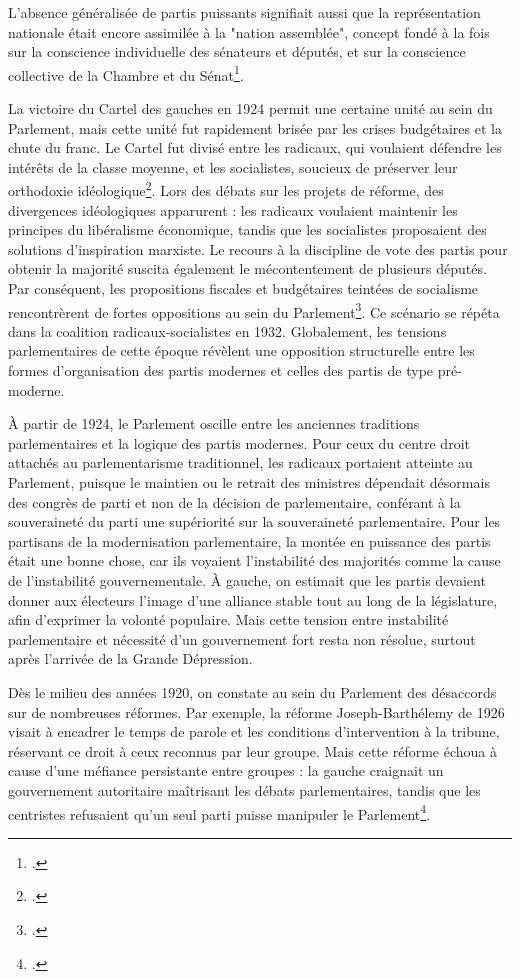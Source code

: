 \documentclass[a4paper,twoside,12pt]{book}
\begin{document}
L'absence généralisée de partis puissants signifiait aussi que la représentation nationale était encore assimilée à la "nation assemblée", concept fondé à la fois sur la conscience individuelle des sénateurs et députés, et sur la conscience collective de la Chambre et du Sénat\footcite[p.344]{zotero-515}.

La victoire du Cartel des gauches en 1924 permit une certaine unité au sein du Parlement, mais cette unité fut rapidement brisée par les crises budgétaires et la chute du franc. Le Cartel fut divisé entre les radicaux, qui voulaient défendre les intérêts de la classe moyenne, et les socialistes, soucieux de préserver leur orthodoxie idéologique\footcite[p.349]{zotero-515}. Lors des débats sur les projets de réforme, des divergences idéologiques apparurent : les radicaux voulaient maintenir les principes du libéralisme économique, tandis que les socialistes proposaient des solutions d'inspiration marxiste. Le recours à la discipline de vote des partis pour obtenir la majorité suscita également le mécontentement de plusieurs députés. Par conséquent, les propositions fiscales et budgétaires teintées de socialisme rencontrèrent de fortes oppositions au sein du Parlement\footcite[p.350]{zotero-515}. Ce scénario se répéta dans la coalition radicaux-socialistes en 1932. Globalement, les tensions parlementaires de cette époque révèlent une opposition structurelle entre les formes d'organisation des partis modernes et celles des partis de type pré-moderne.

À partir de 1924, le Parlement oscille entre les anciennes traditions parlementaires et la logique des partis modernes. Pour ceux du centre droit attachés au parlementarisme traditionnel, les radicaux portaient atteinte au Parlement, puisque le maintien ou le retrait des ministres dépendait désormais des congrès de parti et non de la décision de parlementaire, conférant à la souveraineté du parti une supériorité sur la souveraineté parlementaire. Pour les partisans de la modernisation parlementaire, la montée en puissance des partis était une bonne chose, car ils voyaient l'instabilité des majorités comme la cause de l'instabilité gouvernementale. À gauche, on estimait que les partis devaient donner aux électeurs l'image d'une alliance stable tout au long de la législature, afin d'exprimer la volonté populaire. Mais cette tension entre instabilité parlementaire et nécessité d'un gouvernement fort resta non résolue, surtout après l'arrivée de la Grande Dépression.

Dès le milieu des années 1920, on constate au sein du Parlement des désaccords sur de nombreuses réformes. Par exemple, la réforme Joseph-Barthélemy de 1926 visait à encadrer le temps de parole et les conditions d'intervention à la tribune, réservant ce droit à ceux reconnus par leur groupe. Mais cette réforme échoua à cause d'une méfiance persistante entre groupes : la gauche craignait un gouvernement autoritaire maîtrisant les débats parlementaires, tandis que les centristes refusaient qu'un seul parti puisse manipuler le Parlement\footcite[p.355]{zotero-515}.
\end{document}
